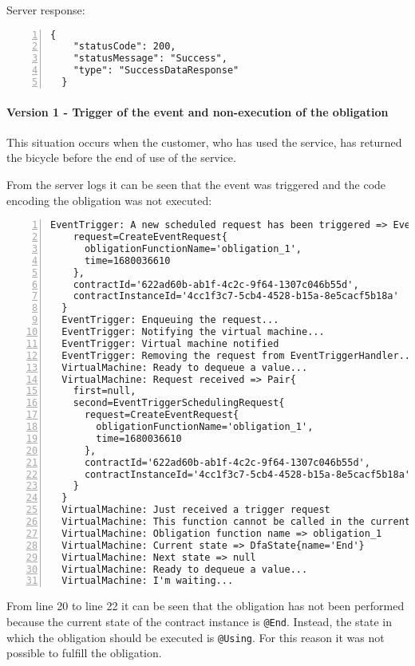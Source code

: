 Server response:
\begin{Verbatim}[numbers=left,xleftmargin=1cm,firstnumber=1,breaklines=true,breakanywhere=true,tabsize=2]
  {
    "statusCode": 200,
    "statusMessage": "Success",
    "type": "SuccessDataResponse"
  }
\end{Verbatim}

\newpage
\paragraph{Version 1 - Trigger of the event and non-execution of the obligation}

This situation occurs when the customer, who has used the service, has returned the bicycle before the 
end of use of the service.

From the server logs it can be seen that the event was triggered and the code encoding the obligation was 
not executed:
\begin{Verbatim}[numbers=left,xleftmargin=1cm,firstnumber=1,breaklines=true,breakanywhere=true,tabsize=2]
  EventTrigger: A new scheduled request has been triggered => EventTriggerSchedulingRequest{
    request=CreateEventRequest{
      obligationFunctionName='obligation_1', 
      time=1680036610
    }, 
    contractId='622ad60b-ab1f-4c2c-9f64-1307c046b55d', 
    contractInstanceId='4cc1f3c7-5cb4-4528-b15a-8e5cacf5b18a'
  }
  EventTrigger: Enqueuing the request...
  EventTrigger: Notifying the virtual machine...
  EventTrigger: Virtual machine notified
  EventTrigger: Removing the request from EventTriggerHandler...
  VirtualMachine: Ready to dequeue a value...
  VirtualMachine: Request received => Pair{
    first=null, 
    second=EventTriggerSchedulingRequest{
      request=CreateEventRequest{
        obligationFunctionName='obligation_1', 
        time=1680036610
      }, 
      contractId='622ad60b-ab1f-4c2c-9f64-1307c046b55d', 
      contractInstanceId='4cc1f3c7-5cb4-4528-b15a-8e5cacf5b18a'
    }
  }
  VirtualMachine: Just received a trigger request
  VirtualMachine: This function cannot be called in the current state
  VirtualMachine: Obligation function name => obligation_1
  VirtualMachine: Current state => DfaState{name='End'}
  VirtualMachine: Next state => null
  VirtualMachine: Ready to dequeue a value...
  VirtualMachine: I'm waiting...
\end{Verbatim}

From line 20 to line 22 it can be seen that the obligation has not been performed because the current 
state of the contract instance is \verb|@End|. Instead, the state in which the obligation should be 
executed is \verb|@Using|. For this reason it was not possible to fulfill the obligation.

